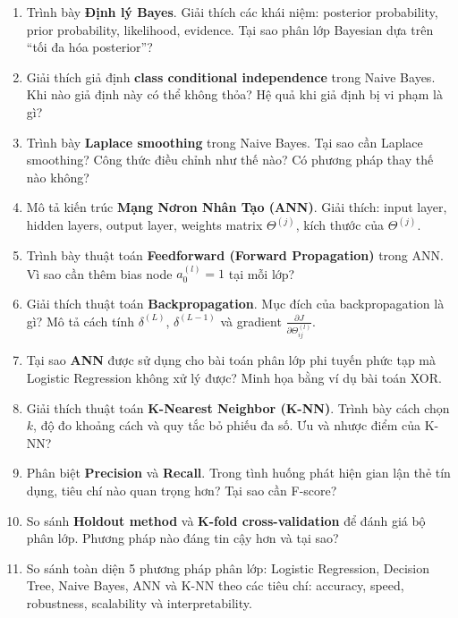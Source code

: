 \documentclass[10pt]{article}
\begin{document}
\begin{enumerate}[leftmargin=*, label=\textbf{Câu \arabic*.}]
    \item Trình bày \textbf{Định lý Bayes}. Giải thích các khái niệm: posterior probability, prior probability, likelihood, evidence. Tại sao phân lớp Bayesian dựa trên ``tối đa hóa posterior''?

    \item Giải thích giả định \textbf{class conditional independence} trong Naive Bayes. Khi nào giả định này có thể không thỏa? Hệ quả khi giả định bị vi phạm là gì?

    \item Trình bày \textbf{Laplace smoothing} trong Naive Bayes. Tại sao cần Laplace smoothing? Công thức điều chỉnh như thế nào? Có phương pháp thay thế nào không?

    \item Mô tả kiến trúc \textbf{Mạng Nơron Nhân Tạo (ANN)}. Giải thích: input layer, hidden layers, output layer, weights matrix $\Theta^{(j)}$, kích thước của $\Theta^{(j)}$.

    \item Trình bày thuật toán \textbf{Feedforward (Forward Propagation)} trong ANN. Vì sao cần thêm bias node $a_0^{(l)} = 1$ tại mỗi lớp?

    \item Giải thích thuật toán \textbf{Backpropagation}. Mục đích của backpropagation là gì? Mô tả cách tính $\delta^{(L)}$, $\delta^{(L-1)}$ và gradient $\frac{\partial J}{\partial \Theta^{(l)}_{ij}}$.

    \item Tại sao \textbf{ANN} được sử dụng cho bài toán phân lớp phi tuyến phức tạp mà Logistic Regression không xử lý được? Minh họa bằng ví dụ bài toán XOR.

    \item Giải thích thuật toán \textbf{K-Nearest Neighbor (K-NN)}. Trình bày cách chọn $k$, độ đo khoảng cách và quy tắc bỏ phiếu đa số. Ưu và nhược điểm của K-NN?

    \item Phân biệt \textbf{Precision} và \textbf{Recall}. Trong tình huống phát hiện gian lận thẻ tín dụng, tiêu chí nào quan trọng hơn? Tại sao cần F-score?

    \item So sánh \textbf{Holdout method} và \textbf{K-fold cross-validation} để đánh giá bộ phân lớp. Phương pháp nào đáng tin cậy hơn và tại sao?

    \item So sánh toàn diện 5 phương pháp phân lớp: Logistic Regression, Decision Tree, Naive Bayes, ANN và K-NN theo các tiêu chí: accuracy, speed, robustness, scalability và interpretability.

\end{enumerate}
\end{document}
